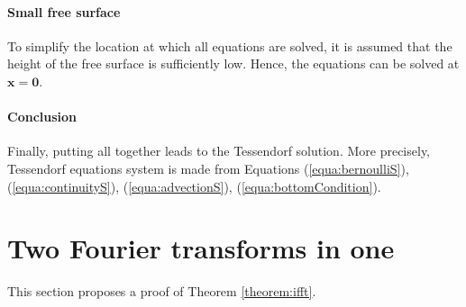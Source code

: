 \documentclass[final]{jcgt}
\begin{document}
\paragraph{Small free surface}
To simplify the location at which all equations are solved, it is assumed that the height of the free surface is sufficiently low. Hence, the equations can be solved at $\mathbf x=\mathbf0$.

\paragraph{Conclusion}
Finally, putting all together leads to the Tessendorf solution.
More precisely, Tessendorf equations system is made from Equations (\ref{equa:bernoulliS}), (\ref{equa:continuityS}), (\ref{equa:advectionS}), (\ref{equa:bottomCondition}).


\section{Two Fourier transforms in one}
\label{sec:annexe-2IFFT}
This section proposes a proof of Theorem \ref{theorem:ifft}.
\end{document}
